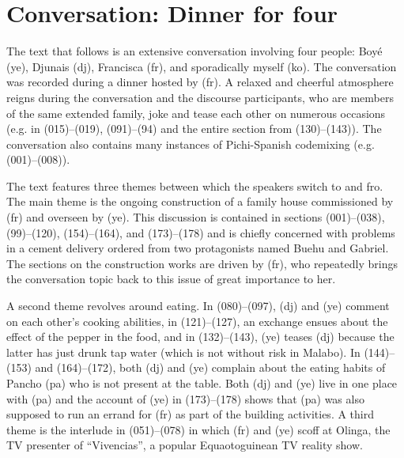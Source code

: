 \newpage
{}\z

\section{Conversation: Dinner for four}

The text that follows is an extensive conversation involving four people: Boyé (ye), Djunais (dj), Francisca (fr), and sporadically myself (ko). The conversation was recorded during a dinner hosted by (fr). A relaxed and cheerful atmosphere reigns during the conversation and the discourse participants, who are members of the same extended family, joke and tease each other on numerous occasions (e.g. in (015)–(019), (091)–(94) and the entire section from (130)–(143)). The conversation also contains many instances of Pichi-Spanish codemixing (e.g. (001)–(008)).


The text features three themes between which the speakers switch to and fro. The main theme is the ongoing construction of a family house commissioned by (fr) and overseen by (ye). This discussion is contained in sections (001)–(038), (99)–(120), (154)–(164), and (173)–(178) and is chiefly concerned with problems in a cement delivery ordered from two protagonists named Buehu and Gabriel. The sections on the construction works are driven by (fr), who repeatedly brings the conversation topic back to this issue of great importance to her.



A second theme revolves around eating. In (080)–(097), (dj) and (ye) comment on each other’s cooking abilities, in (121)–(127), an exchange ensues about the effect of the pepper in the food, and in (132)–(143), (ye) teases (dj) because the latter has just drunk tap water (which is not without risk in Malabo). In (144)–(153) and (164)–(172), both (dj) and (ye) complain about the eating habits of Pancho (pa) who is not present at the table. Both (dj) and (ye) live in one place with (pa) and the account of (ye) in (173)–(178) shows that (pa) was also supposed to run an errand for (fr) as part of the building activities. A third theme is the interlude in (051)–(078) in which (fr) and (ye) scoff at Olinga, the TV presenter of “Vivencias”, a popular Equaotoguinean TV reality show.

